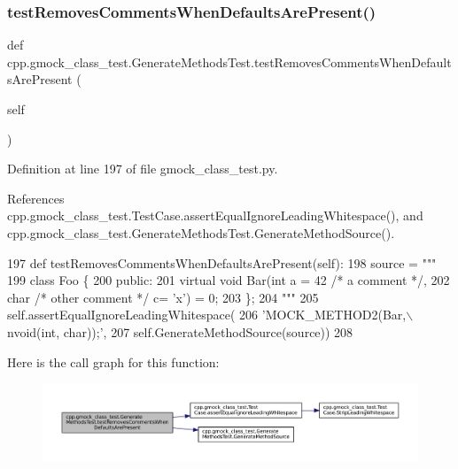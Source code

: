 \subsubsection{\texorpdfstring{test\+Removes\+Comments\+When\+Defaults\+Are\+Present()}{testRemovesCommentsWhenDefaultsArePresent()}}
{\footnotesize\ttfamily def cpp.\+gmock\+\_\+class\+\_\+test.\+Generate\+Methods\+Test.\+test\+Removes\+Comments\+When\+Defaults\+Are\+Present (\begin{DoxyParamCaption}\item[{}]{self }\end{DoxyParamCaption})}



Definition at line 197 of file gmock\+\_\+class\+\_\+test.\+py.



References cpp.\+gmock\+\_\+class\+\_\+test.\+Test\+Case.\+assert\+Equal\+Ignore\+Leading\+Whitespace(), and cpp.\+gmock\+\_\+class\+\_\+test.\+Generate\+Methods\+Test.\+Generate\+Method\+Source().


\begin{DoxyCode}
197   \textcolor{keyword}{def }testRemovesCommentsWhenDefaultsArePresent(self):
198     source = \textcolor{stringliteral}{"""}
199 \textcolor{stringliteral}{class Foo \{}
200 \textcolor{stringliteral}{ public:}
201 \textcolor{stringliteral}{  virtual void Bar(int a = 42 /* a comment */,}
202 \textcolor{stringliteral}{                   char /* other comment */ c= 'x') = 0;}
203 \textcolor{stringliteral}{\};}
204 \textcolor{stringliteral}{"""}
205     self.assertEqualIgnoreLeadingWhitespace(
206         \textcolor{stringliteral}{'MOCK\_METHOD2(Bar,\(\backslash\)nvoid(int, char));'},
207         self.GenerateMethodSource(source))
208 
\end{DoxyCode}
Here is the call graph for this function\+:
\nopagebreak
\begin{figure}[H]
\begin{center}
\leavevmode
\includegraphics[width=350pt]{classcpp_1_1gmock__class__test_1_1GenerateMethodsTest_add445941c6503198f0c3a25e00d20b9f_cgraph}
\end{center}
\end{figure}
\mbox{\label{classcpp_1_1gmock__class__test_1_1GenerateMethodsTest_affdc748928d26be259345ed6a8753988}} 
